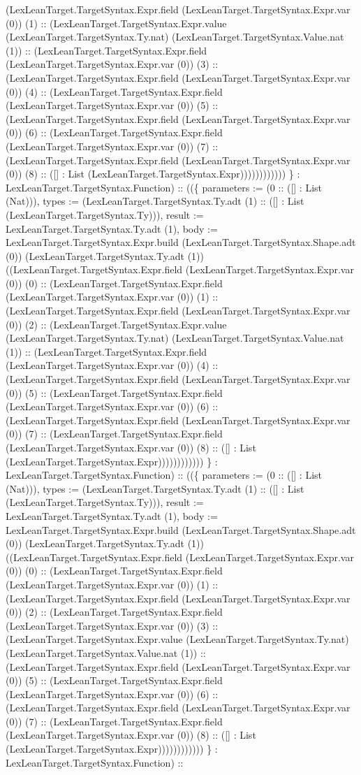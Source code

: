 \documentclass[11pt]{article}
\begin{document}
(LexLeanTarget.TargetSyntax.Expr.field (LexLeanTarget.TargetSyntax.Expr.var (0)) (1) :: (LexLeanTarget.TargetSyntax.Expr.value (LexLeanTarget.TargetSyntax.Ty.nat) (LexLeanTarget.TargetSyntax.Value.nat (1)) :: (LexLeanTarget.TargetSyntax.Expr.field (LexLeanTarget.TargetSyntax.Expr.var (0)) (3) :: (LexLeanTarget.TargetSyntax.Expr.field (LexLeanTarget.TargetSyntax.Expr.var (0)) (4) :: (LexLeanTarget.TargetSyntax.Expr.field (LexLeanTarget.TargetSyntax.Expr.var (0)) (5) :: (LexLeanTarget.TargetSyntax.Expr.field (LexLeanTarget.TargetSyntax.Expr.var (0)) (6) :: (LexLeanTarget.TargetSyntax.Expr.field (LexLeanTarget.TargetSyntax.Expr.var (0)) (7) :: (LexLeanTarget.TargetSyntax.Expr.field (LexLeanTarget.TargetSyntax.Expr.var (0)) (8) :: ([] : List (LexLeanTarget.TargetSyntax.Expr)))))))))))) \} : LexLeanTarget.TargetSyntax.Function) :: ((\{ parameters := (0 :: ([] : List (Nat))), types := (LexLeanTarget.TargetSyntax.Ty.adt (1) :: ([] : List (LexLeanTarget.TargetSyntax.Ty))), result := LexLeanTarget.TargetSyntax.Ty.adt (1), body := LexLeanTarget.TargetSyntax.Expr.build (LexLeanTarget.TargetSyntax.Shape.adt (0)) (LexLeanTarget.TargetSyntax.Ty.adt (1)) ((LexLeanTarget.TargetSyntax.Expr.field (LexLeanTarget.TargetSyntax.Expr.var (0)) (0) :: (LexLeanTarget.TargetSyntax.Expr.field (LexLeanTarget.TargetSyntax.Expr.var (0)) (1) :: (LexLeanTarget.TargetSyntax.Expr.field (LexLeanTarget.TargetSyntax.Expr.var (0)) (2) :: (LexLeanTarget.TargetSyntax.Expr.value (LexLeanTarget.TargetSyntax.Ty.nat) (LexLeanTarget.TargetSyntax.Value.nat (1)) :: (LexLeanTarget.TargetSyntax.Expr.field (LexLeanTarget.TargetSyntax.Expr.var (0)) (4) :: (LexLeanTarget.TargetSyntax.Expr.field (LexLeanTarget.TargetSyntax.Expr.var (0)) (5) :: (LexLeanTarget.TargetSyntax.Expr.field (LexLeanTarget.TargetSyntax.Expr.var (0)) (6) :: (LexLeanTarget.TargetSyntax.Expr.field (LexLeanTarget.TargetSyntax.Expr.var (0)) (7) :: (LexLeanTarget.TargetSyntax.Expr.field (LexLeanTarget.TargetSyntax.Expr.var (0)) (8) :: ([] : List (LexLeanTarget.TargetSyntax.Expr)))))))))))) \} : LexLeanTarget.TargetSyntax.Function) :: ((\{ parameters := (0 :: ([] : List (Nat))), types := (LexLeanTarget.TargetSyntax.Ty.adt (1) :: ([] : List (LexLeanTarget.TargetSyntax.Ty))), result := LexLeanTarget.TargetSyntax.Ty.adt (1), body := LexLeanTarget.TargetSyntax.Expr.build (LexLeanTarget.TargetSyntax.Shape.adt (0)) (LexLeanTarget.TargetSyntax.Ty.adt (1)) ((LexLeanTarget.TargetSyntax.Expr.field (LexLeanTarget.TargetSyntax.Expr.var (0)) (0) :: (LexLeanTarget.TargetSyntax.Expr.field (LexLeanTarget.TargetSyntax.Expr.var (0)) (1) :: (LexLeanTarget.TargetSyntax.Expr.field (LexLeanTarget.TargetSyntax.Expr.var (0)) (2) :: (LexLeanTarget.TargetSyntax.Expr.field (LexLeanTarget.TargetSyntax.Expr.var (0)) (3) :: (LexLeanTarget.TargetSyntax.Expr.value (LexLeanTarget.TargetSyntax.Ty.nat) (LexLeanTarget.TargetSyntax.Value.nat (1)) :: (LexLeanTarget.TargetSyntax.Expr.field (LexLeanTarget.TargetSyntax.Expr.var (0)) (5) :: (LexLeanTarget.TargetSyntax.Expr.field (LexLeanTarget.TargetSyntax.Expr.var (0)) (6) :: (LexLeanTarget.TargetSyntax.Expr.field (LexLeanTarget.TargetSyntax.Expr.var (0)) (7) :: (LexLeanTarget.TargetSyntax.Expr.field (LexLeanTarget.TargetSyntax.Expr.var (0)) (8) :: ([] : List (LexLeanTarget.TargetSyntax.Expr)))))))))))) \} : LexLeanTarget.TargetSyntax.Function) :: 
\end{document}
